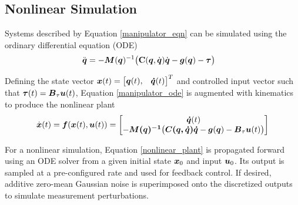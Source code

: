 \subsection{Nonlinear Simulation}
Systems described by Equation \eqref{manipulator_eqn} can be simulated using the ordinary differential equation (ODE)
\begin{equation}
\label{manipulator_ode}
\begin{aligned}
	\ddot{\vb*{q}} &= -\vb*{M}(\vb*{q})^{-1}\big{(}\vb{C}(\vb*{q}, \dot{\vb*{q}})\dot{\vb*{q}} - \vb*{g}(\vb*{q}) - \vb*{\tau}\big{)}
\end{aligned}
\end{equation}

Defining the state vector $\vb*{x}(t) = \begin{bmatrix} \vb*{q}(t), & \vb*{\dot{q}}(t) \end{bmatrix}^{T}$ and controlled input vector such that $\vb*{\tau}(t) = \vb*{B}_{\tau}\vb*{u}(t)$, Equation \eqref{manipulator_ode} is augmented with kinematics to produce the nonlinear plant
\begin{equation}
\label{nonlinear_plant}
\begin{aligned}
	\dot{\vb*{x}}(t) = \vb*{f}(\vb*{x}(t), \vb*{u}(t)) =
	\begin{bmatrix}
		\vb*{\dot{q}}(t)\\
		-\vb*{M(q)^{-1}\big{(} C(q, \dot{q})\dot{q}} - \vb*{g}(\vb*{q}) - \vb*{B}_{\tau}\vb*{u}(t) \big{)}\\
	\end{bmatrix}
\end{aligned}
\end{equation}

For a nonlinear simulation, Equation \eqref{nonlinear_plant} is propagated forward using an ODE solver from a given initial state $\vb*{x}_{0}$ and input $\vb*{u}_{0}$.  Its output is sampled at a pre-configured rate and used for feedback control.  If desired, additive zero-mean Gaussian noise is superimposed onto the discretized outputs to simulate measurement perturbations.

